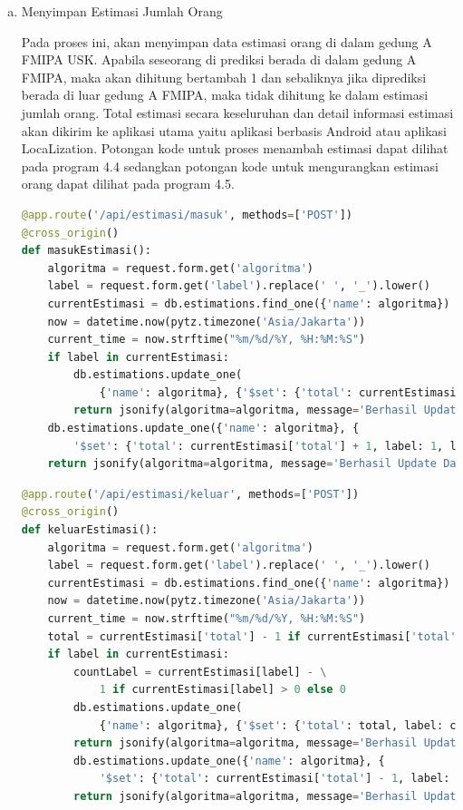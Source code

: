 \begin{enumerate}[1.]
\begin{enumerate}[a.]
		      \item Menyimpan Estimasi Jumlah Orang
		            \par Pada proses ini, akan menyimpan data estimasi orang di dalam gedung A FMIPA USK. Apabila seseorang di prediksi berada di dalam gedung A FMIPA, maka akan dihitung bertambah 1 dan sebaliknya jika diprediksi berada di luar gedung A FMIPA, maka tidak dihitung ke dalam estimasi jumlah orang. Total estimasi secara keseluruhan dan detail informasi estimasi akan dikirim ke aplikasi utama yaitu aplikasi berbasis Android atau aplikasi LocaLization. Potongan kode untuk proses menambah estimasi dapat dilihat pada program 4.4 sedangkan potongan kode untuk mengurangkan estimasi orang dapat dilihat pada program 4.5.
		            \begin{lstlisting}[language=Python]
@app.route('/api/estimasi/masuk', methods=['POST'])
@cross_origin()
def masukEstimasi():
	algoritma = request.form.get('algoritma')
	label = request.form.get('label').replace(' ', '_').lower()
	currentEstimasi = db.estimations.find_one({'name': algoritma})
	now = datetime.now(pytz.timezone('Asia/Jakarta'))
	current_time = now.strftime("%m/%d/%Y, %H:%M:%S")
	if label in currentEstimasi:
		db.estimations.update_one(
			{'name': algoritma}, {'$set': {'total': currentEstimasi['total'] + 1, label: currentEstimasi[label] + 1, label+'_time': current_time, 'total_time': current_time}})
		return jsonify(algoritma=algoritma, message='Berhasil Update Data')
	db.estimations.update_one({'name': algoritma}, {
		'$set': {'total': currentEstimasi['total'] + 1, label: 1, label+'_time': current_time, 'total_time': current_time}})
	return jsonify(algoritma=algoritma, message='Berhasil Update Data')		\end{lstlisting}

		            \begin{lstlisting}[language=Python]
@app.route('/api/estimasi/keluar', methods=['POST'])
@cross_origin()
def keluarEstimasi():
	algoritma = request.form.get('algoritma')
	label = request.form.get('label').replace(' ', '_').lower()
	currentEstimasi = db.estimations.find_one({'name': algoritma})
	now = datetime.now(pytz.timezone('Asia/Jakarta'))
	current_time = now.strftime("%m/%d/%Y, %H:%M:%S")
	total = currentEstimasi['total'] - 1 if currentEstimasi['total'] > 0 else 0
	if label in currentEstimasi:
		countLabel = currentEstimasi[label] - \
			1 if currentEstimasi[label] > 0 else 0
		db.estimations.update_one(
			{'name': algoritma}, {'$set': {'total': total, label: countLabel, label+'_time': current_time, 'total_time': current_time}})
		return jsonify(algoritma=algoritma, message='Berhasil Update Data')
		db.estimations.update_one({'name': algoritma}, {
			'$set': {'total': currentEstimasi['total'] - 1, label: 0, label+'_time': current_time, 'total_time': current_time}})
		return jsonify(algoritma=algoritma, message='Berhasil Update Data')		\end{lstlisting}


\end{enumerate}
\end{enumerate}
